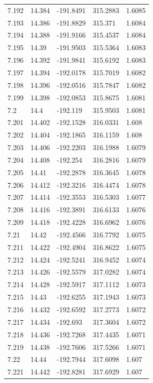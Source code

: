 \begin{tabular}{lllll}
7.192 & 14.384 & -191.8491 & 315.2883 & 1.6085 \\
7.193 & 14.386 & -191.8829 & 315.371 & 1.6084 \\
7.194 & 14.388 & -191.9166 & 315.4537 & 1.6084 \\
7.195 & 14.39 & -191.9503 & 315.5364 & 1.6083 \\
7.196 & 14.392 & -191.9841 & 315.6192 & 1.6083 \\
7.197 & 14.394 & -192.0178 & 315.7019 & 1.6082 \\
7.198 & 14.396 & -192.0516 & 315.7847 & 1.6082 \\
7.199 & 14.398 & -192.0853 & 315.8675 & 1.6081 \\
7.2 & 14.4 & -192.119 & 315.9503 & 1.6081 \\
7.201 & 14.402 & -192.1528 & 316.0331 & 1.608 \\
7.202 & 14.404 & -192.1865 & 316.1159 & 1.608 \\
7.203 & 14.406 & -192.2203 & 316.1988 & 1.6079 \\
7.204 & 14.408 & -192.254 & 316.2816 & 1.6079 \\
7.205 & 14.41 & -192.2878 & 316.3645 & 1.6078 \\
7.206 & 14.412 & -192.3216 & 316.4474 & 1.6078 \\
7.207 & 14.414 & -192.3553 & 316.5303 & 1.6077 \\
7.208 & 14.416 & -192.3891 & 316.6133 & 1.6076 \\
7.209 & 14.418 & -192.4228 & 316.6962 & 1.6076 \\
7.21 & 14.42 & -192.4566 & 316.7792 & 1.6075 \\
7.211 & 14.422 & -192.4904 & 316.8622 & 1.6075 \\
7.212 & 14.424 & -192.5241 & 316.9452 & 1.6074 \\
7.213 & 14.426 & -192.5579 & 317.0282 & 1.6074 \\
7.214 & 14.428 & -192.5917 & 317.1112 & 1.6073 \\
7.215 & 14.43 & -192.6255 & 317.1943 & 1.6073 \\
7.216 & 14.432 & -192.6592 & 317.2773 & 1.6072 \\
7.217 & 14.434 & -192.693 & 317.3604 & 1.6072 \\
7.218 & 14.436 & -192.7268 & 317.4435 & 1.6071 \\
7.219 & 14.438 & -192.7606 & 317.5266 & 1.6071 \\
7.22 & 14.44 & -192.7944 & 317.6098 & 1.607 \\
7.221 & 14.442 & -192.8281 & 317.6929 & 1.607 \\

\end{tabular}
